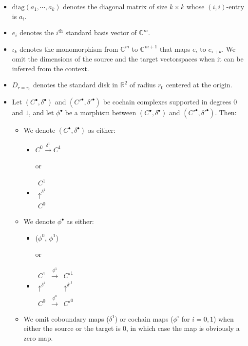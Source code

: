 \begin{itemize}[label={--}]
\item $\text{diag}(a_1,\cdots, a_k)$ denotes the diagonal matrix of size $k\times k$ whose $(i,i)$-entry is $a_i$.

\item $e_i$ denotes the $i^{\text{th}}$ standard basis vector of $\mathbb{C}^m$.

\item $\iota_k$ denotes the monomorphism from $\mathbb{C}^m$ to $\mathbb{C}^{m+1}$ that maps $e_i$ to $e_{i+k}$. We omit the dimensions of the source and the target vectorspaces when it can be inferred from the context.

\item $D_{r=r_0}$ denotes the standard disk in $\mathbb{R}^2$ of radius $r_0$ centered at the origin.

\item Let $(C^\bullet,\delta^\bullet)$ and $(C'^\bullet,\delta'^\bullet)$ be cochain complexes supported in degrees $0$ and $1$, and let $\phi^\bullet$ be a morphism between $(C^\bullet,\delta^\bullet)$ and $(C'^\bullet,\delta'^\bullet)$. Then:
\begin{itemize}[label = $\circ$]
\item We denote $(C^\bullet,\delta^\bullet)$ as either:
\begin{itemize}
\item $C^0 \xrightarrow{\delta^1} C^1$
    
    or
    
\item $\begin{array}{c}
      C^1 \\
      \uparrow^{\delta^1} \\
      C^0
      \end{array}$
\end{itemize}
\item We denote $\phi^\bullet$ as either:
\begin{itemize}
\item ($\phi^0$, $\phi^1$)
    
    or
    
\item $\begin{array}{ccc}
      C^1 & \xrightarrow{\phi^1} & C'^1 \\
      \uparrow^{\delta^1} & & \uparrow^{\delta'^1} \\
      C^0 & \xrightarrow{\phi^0} & C'^0
      \end{array}$
\end{itemize}
\item We omit coboundary maps ($\delta^1$) or cochain maps ($\phi^i$ for $i=0,1$) when either the source or the target is $0$, in which case the map is obviously a zero map.
    

\end{itemize}
\end{itemize}
